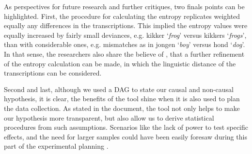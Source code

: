 As perspectives for future research and further critiques, two finals points can be highlighted. First, the procedure for calculating the entropy replicates weighted equally any differences in the transcriptions. This implied the entropy values were equally increased by fairly small deviances, e.g. kikker `\textit{frog}' versus kikkers `\textit{frogs}', than with considerable ones, e.g. mismatches as in jongen `\textit{boy}' versus hond `\textit{dog}'. In that sense, the researchers also share the believe of \citet{Boonen_et_al_2021}, that a further refinement of the entropy calculation can be made, in which the linguistic distance of the transcriptions can be considered.

Second and last, although we used a DAG to state our causal and non-causal hypothesis, it is clear, the benefits of the tool shine when it is also used to plan the data collection. As stated in the document, the tool not only helps to make our hypothesis more transparent, but also allow us to derive statistical procedures from such assumptions. Scenarios like the lack of power to test specific effects, and the need for larger samples could have been easily foresaw during this part of the experimental planning \cite{McElreath_2020, Fogarty_et_al_2022}.
%
\begin{comment}	
	and remains to determined if these observations were a result of the actual variability in the data or an artifact of the measurement procedure?
\end{comment}
%
%